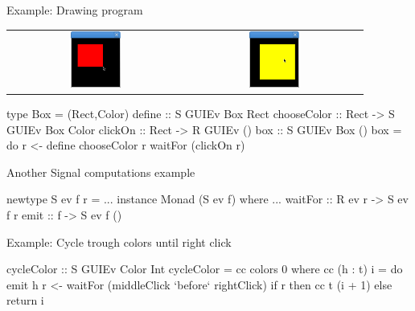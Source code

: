 \documentclass{beamer}
\begin{document}
\begin{frame}{Example: Drawing program}
\centering
\begin{tabular}{c c}
\includegraphics[width=0.3\textwidth]{01.png}
&
\includegraphics[width=0.3\textwidth]{02.png}
\end{tabular}
\pause
\begin{code}
type Box = (Rect,Color)
define        ::          S GUIEv Box Rect
chooseColor   :: Rect ->  S GUIEv Box Color
clickOn       :: Rect ->  R GUIEv ()
box ::  S GUIEv Box ()
box = do  r <- define
          chooseColor r
          waitFor (clickOn r)
\end{code}
\end{frame}


\begin{frame}{Another Signal computations example}
\begin{code} 
newtype S ev f r = ...
instance Monad (S ev f) where ...
waitFor   :: R ev r -> S ev f r
emit      :: f -> S ev f ()
\end{code}

Example: Cycle trough colors until right click 
\begin{code}
cycleColor :: S GUIEv Color Int
cycleColor = cc colors 0 where
   cc (h : t) i = 
     do  emit h
         r <- waitFor (middleClick `before` rightClick)
         if r then cc t (i + 1) else return i
\end{code}

\end{frame}
\end{document}
